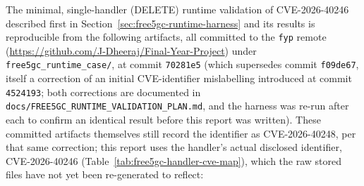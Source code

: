 \documentclass[12pt,a4paper]{report}
\begin{document}
The minimal, single-handler (DELETE) runtime validation of CVE-2026-40246 described first in Section~\ref{sec:free5gc-runtime-harness} and its results is reproducible from the following artifacts, all committed to the \texttt{fyp} remote (\url{https://github.com/J-Dheeraj/Final-Year-Project}) under \texttt{free5gc\_runtime\_case/}, at commit \texttt{70281e5} (which supersedes commit \texttt{f09de67}, itself a correction of an initial CVE-identifier mislabelling introduced at commit \texttt{4524193}; both corrections are documented in \texttt{docs/\allowbreak FREE5GC\_RUNTIME\_VALIDATION\_PLAN.md}, and the harness was re-run after each to confirm an identical result before this report was written). These committed artifacts themselves still record the identifier as CVE-2026-40248, per that same correction; this report uses the handler's actual disclosed identifier, CVE-2026-40246 (Table~\ref{tab:free5gc-handler-cve-map}), which the raw stored files have not yet been re-generated to reflect:
\end{document}
